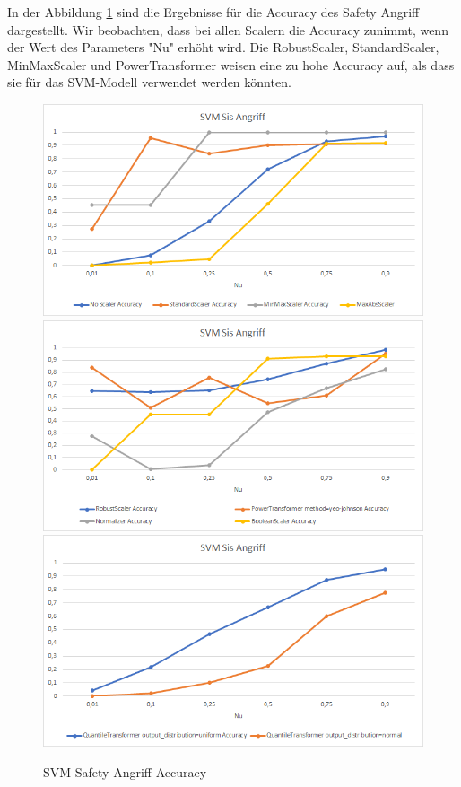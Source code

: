 \documentclass[12pt,a4paper]{scrartcl}
\numberwithin{equation}{section}
\begin{document}
In der Abbildung \ref{sis_svm_results} sind die Ergebnisse für die Accuracy des Safety Angriff dargestellt. Wir beobachten, dass bei allen Scalern die Accuracy zunimmt, wenn der Wert des Parameters "Nu" erhöht wird. Die RobustScaler, StandardScaler, MinMaxScaler und PowerTransformer weisen eine zu hohe Accuracy auf, als dass sie für das SVM-Modell verwendet werden könnten. 

\begin{figure}[ht!]
	\centering
	  \includegraphics[scale=0.5]{sis_svm_1.png}
	  \includegraphics[scale=0.5]{sis_svm_2.png}
	  \includegraphics[scale=0.5]{sis_svm_3.png}
	  \caption{SVM Safety Angriff Accuracy}
	\label{sis_svm_results}
\end{figure}
\end{document}
